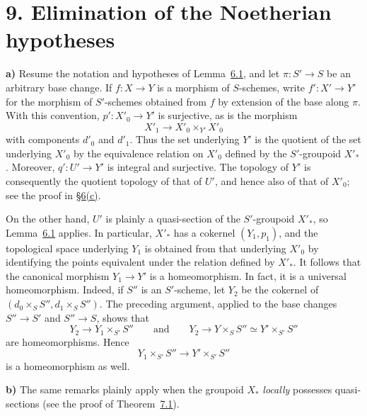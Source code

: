 \section*{9. Elimination of the Noetherian hypotheses}
\label{sec:sga3-V-9}

\medskip
{}\label{par:sga3-V-9-a}%
\noindent\textbf{a)}\quad
Resume the notation and hypotheses of
Lemma~\hyperref[lem:sga3-V-6.1]{6.1}, and let
\(\pi:S'\to S\) be an arbitrary base change. If \(f:X\to Y\) is a
morphism of \(S\)-schemes, write \(f':X'\to Y'\) for the morphism of
\(S'\)-schemes obtained from \(f\) by extension of the base along
\(\pi\). With this convention, \(p':X'_0\to Y'\) is surjective, as is
the morphism
\[
  X'_1\longrightarrow X'_0\times_{Y'}X'_0
\]
with components \(d'_0\) and \(d'_1\). Thus the set underlying \(Y'\)
is the quotient of the set underlying \(X'_0\) by the equivalence
relation on \(X'_0\) defined by the \(S'\)-groupoid \(X'_\ast\).
Moreover, \(q':U'\to Y'\) is integral and surjective. The topology of
\(Y'\) is consequently the quotient topology of that of \(U'\), and
hence also of that of \(X'_0\); see the proof in
\hyperref[par:sga3-V-6-c]{\S6(c)}.

On the other hand, \(U'\) is plainly a quasi-section of the
\(S'\)-groupoid \(X'_\ast\), so Lemma~\hyperref[lem:sga3-V-6.1]{6.1}
applies. In particular, \(X'_\ast\) has a cokernel \((Y_1,p_1)\), and
the topological space underlying \(Y_1\) is obtained from that
underlying \(X'_0\) by identifying the points equivalent under the
relation defined by \(X'_\ast\). It follows that the canonical
morphism \(Y_1\to Y'\) is a homeomorphism. In fact, it is a universal
homeomorphism. Indeed, if \(S''\) is an \(S'\)-scheme, let \(Y_2\) be
the cokernel of
\((d_0\times_S S'',d_1\times_S S'')\). The preceding argument,
applied to the base changes \(S''\to S'\) and \(S''\to S\), shows that
\[
  Y_2\longrightarrow Y_1\times_{S'}S''
  \qquad\text{and}\qquad
  Y_2\longrightarrow Y\times_SS''\simeq Y'\times_{S'}S''
\]
are homeomorphisms. Hence
\[
  Y_1\times_{S'}S''\longrightarrow Y'\times_{S'}S''
\]
is a homeomorphism as well.

\medskip
{}\label{par:sga3-V-9-b}%
\noindent\textbf{b)}\quad
The same remarks plainly apply when the groupoid \(X_\ast\)
\emph{locally} possesses quasi-sections (see the proof of
Theorem~\hyperref[thm:sga3-V-7.1]{7.1}).
